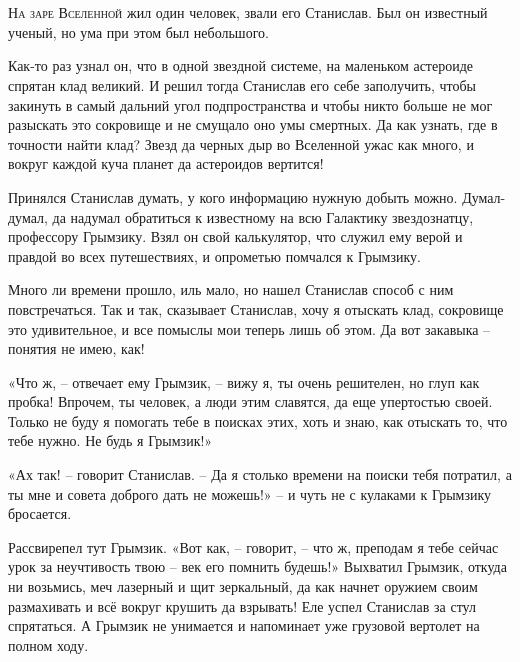 \documentclass[ebook,oneside,final,openright]{memoir}
\begin{document}
\chapter{}
 \lettrine{Н}{а заре Вселенной} жил один человек, звали его Станислав. Был он известный ученый, но ума при этом был небольшого.\par
\par
Как-то раз узнал он, что в одной звездной системе, на маленьком астероиде спрятан клад великий. И решил тогда Станислав его себе заполучить, чтобы закинуть в самый дальний угол подпространства и чтобы никто больше не мог разыскать это сокровище и не смущало оно умы смертных. Да как узнать, где в точности найти клад? Звезд да черных дыр во Вселенной ужас как много, и вокруг каждой куча планет да астероидов вертится!\par
\par
Принялся Станислав думать, у кого информацию нужную добыть можно. Думал-думал, да надумал обратиться к известному на всю Галактику звездознатцу, профессору Грымзику. Взял он свой калькулятор, что служил ему верой и правдой во всех путешествиях, и опрометью помчался к Грымзику.\par
\par
Много ли времени прошло, иль мало, но нашел Станислав способ с ним повстречаться. Так и так, сказывает Станислав, хочу я отыскать клад, сокровище это удивительное, и все помыслы мои теперь лишь об этом. Да вот закавыка – понятия не имею, как!\par
\par
«Что ж, – отвечает ему Грымзик, – вижу я, ты очень решителен, но глуп как пробка! Впрочем, ты человек, а люди этим славятся, да еще упертостью своей. Только не буду я помогать тебе в поисках этих, хоть и знаю, как отыскать то, что тебе нужно. Не будь я Грымзик!» \par
\par
«Ах так! – говорит Станислав. – Да я столько времени на поиски тебя потратил, а ты мне и совета доброго дать не можешь!» – и чуть не с кулаками к Грымзику бросается. \par
\par
Рассвирепел тут Грымзик. «Вот как, – говорит, – что ж, преподам я тебе сейчас урок за неучтивость твою – век его помнить будешь!» Выхватил Грымзик, откуда ни возьмись, меч лазерный и щит зеркальный, да как начнет оружием своим размахивать и всё вокруг крушить да взрывать! Еле успел Станислав за стул спрятаться. А Грымзик не унимается и напоминает уже грузовой вертолет на полном ходу. \par
\end{document}

